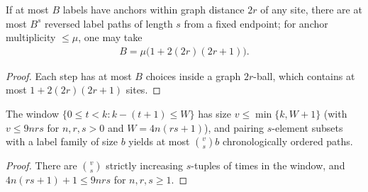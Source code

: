 \begin{lemma}
    \label{thm:al_scan_anchor_path_count}
    \leanok
    If at most $B$ labels have anchors within graph distance $2r$ of any site, there are at most $B^s$ reversed label paths of length $s$ from a fixed endpoint; for anchor multiplicity $\le\mu$, one may take
    \begin{align}
        B=\mu\bigl(1+2(2r)(2r+1)\bigr).
        \label{eq:al_scan_anchor_branching}
    \end{align}
\end{lemma}
\begin{proof}\leanok
    Each step has at most $B$ choices inside a graph $2r$-ball, which contains at most $1+2(2r)(2r+1)$ sites.
\end{proof}

\begin{lemma}
    \label{thm:al_scan_timed_path_count}
    \leanok
    The window $\{0\le t<k:k-(t+1)\le W\}$ has size $v\le\min\{k,W+1\}$ (with $v\le 9nrs$ for $n,r,s>0$ and $W=4n(rs+1)$), and pairing $s$-element subsets with a label family of size $b$ yields at most $\binom vs b$ chronologically ordered paths.
\end{lemma}
\begin{proof}\leanok
    There are $\binom vs$ strictly increasing $s$-tuples of times in the window, and $4n(rs+1)+1\le 9nrs$ for $n,r,s\ge1$.
\end{proof}

